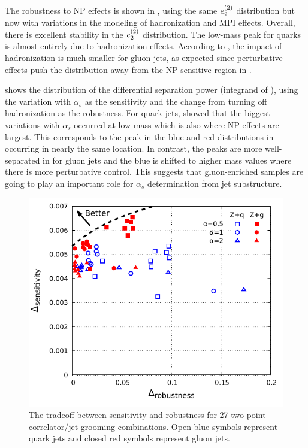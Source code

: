 The robustness to NP effects is shown in , using the same $e_{2}^{(2)}$ distribution but now with variations in the modeling of hadronization and MPI effects.
%
Overall, there is excellent stability in the $e_{2}^{(2)}$ distribution.
%
The low-mass peak for quarks is almost entirely due to hadronization effects.
%
According to \herwig, the impact of hadronization is much smaller for gluon jets, as expected since perturbative effects push the distribution away from the NP-sensitive region in .

 shows the distribution of the differential separation power (integrand of ), using the variation with $\alpha_s$ as the sensitivity and the change from turning off hadronization as the robustness.
%
For quark jets,  showed that the biggest variations with $\alpha_s$ occurred at low mass which is also where NP effects are largest.
%
This corresponds to the peak in the blue and red distributions in  occurring in nearly the same location.
%
In contrast, the peaks are more well-separated in  for gluon jets and the blue is shifted to higher mass values where there is more perturbative control.
%
This suggests that gluon-enriched samples are going to play an important role for $\alpha_s$ determination from jet substructure.

\begin{figure}[t]
\begin{center}
\includegraphics[width = 0.6\columnwidth]{figures/robsep.pdf}
\end{center}
\caption{The tradeoff between sensitivity and robustness for 27 two-point correlator/jet grooming combinations.  Open blue symbols represent quark jets and closed red symbols represent gluon jets.}
\label{fig:robseptradeoff}
\end{figure}


